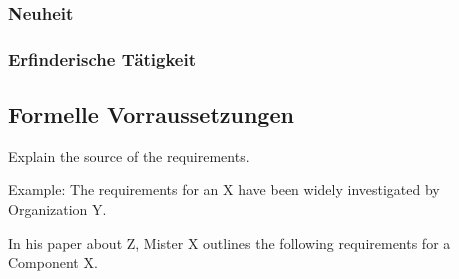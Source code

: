 \subsubsection{Neuheit}

\subsubsection{Erfinderische Tätigkeit}


\subsection{Formelle Vorraussetzungen\label{sec:reqsuba}}
Explain the source of the requirements. 

Example: The requirements for an X have been widely investigated by Organization Y. 

In his paper about Z, Mister X outlines the following requirements for a Component X.

